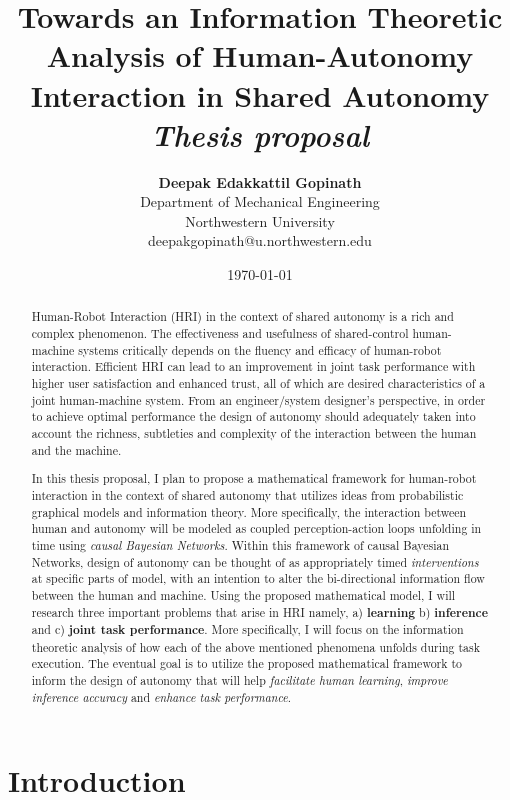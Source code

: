\documentclass[12pt]{article}
\title{{\bf Towards an Information Theoretic Analysis of Human-Autonomy Interaction in Shared Autonomy} \\
\it Thesis proposal}
\author{ {\bf Deepak Edakkattil Gopinath}  \\
Department of Mechanical Engineering \\
Northwestern University\\
{\small deepakgopinath@u.northwestern.edu}
}
\date{\today}
\begin{document}
\pagestyle{plain}
\maketitle

\pagebreak
\begin{abstract}
Human-Robot Interaction (HRI) in the context of shared autonomy is a rich and complex phenomenon. The effectiveness and usefulness of shared-control human-machine systems critically depends on the fluency and efficacy of human-robot interaction. Efficient HRI can lead to an improvement in joint task performance with higher user satisfaction and enhanced trust, all of which are desired characteristics of a joint human-machine system. From an engineer/system designer's perspective, in order to achieve optimal performance the design of autonomy should adequately taken into account the richness, subtleties and complexity of the interaction between the human and the machine.

In this thesis proposal, I plan to propose a mathematical framework for human-robot interaction in the context of shared autonomy that utilizes ideas from probabilistic graphical models and information theory. More specifically, the interaction between human and autonomy will be modeled as coupled perception-action loops unfolding in time using \textit{causal Bayesian Networks}. Within this framework of causal Bayesian Networks, design of autonomy can be thought of as appropriately timed \textit{interventions} at specific parts of model, with an intention to alter the bi-directional information flow between the human and machine. Using the proposed mathematical model, I will research three important problems that arise in HRI namely, a) \textbf{learning} b) \textbf{inference} and c) \textbf{joint task performance}. More specifically, I will focus on the information theoretic analysis of how each of the above mentioned phenomena unfolds during task execution. The eventual goal is to utilize the proposed mathematical framework to inform the design of autonomy that will help \textit{facilitate human learning}, \textit{improve inference accuracy} and \textit{enhance task performance}.
\end{abstract}

\pagebreak
\tableofcontents
\pagebreak

\cleardoublepage
{}

\section{Introduction}
\label{sec:intro}
\end{document}
